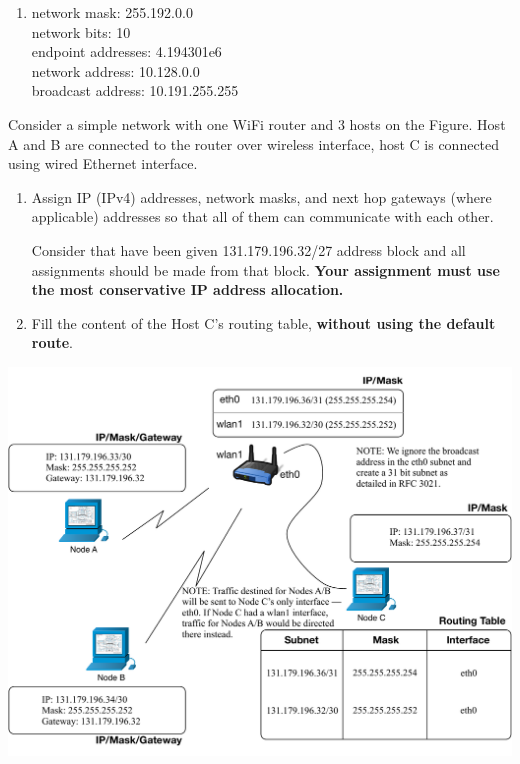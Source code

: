 \documentclass{report}
\begin{document}
\begin{problem}
\begin{answer}{30em}
\begin{multicols*}{2}
\begin{enumerate}
    \columnbreak

    \item network mask: 255.192.0.0\\
          network bits: 10\\
          endpoint addresses: 4.194301e6\\
          network address: 10.128.0.0\\
          broadcast address: 10.191.255.255
  \end{enumerate}
  \end{multicols*}
\end{answer}

\end{problem}


\clearpage
\begin{problem}

Consider a simple network with one WiFi router and 3 hosts on the Figure.  Host A and B are connected to the router over wireless interface, host C is connected using wired Ethernet interface.


\begin{enumerate}
\item Assign IP (IPv4) addresses, network masks, and next hop gateways (where applicable) addresses so that all of them can communicate with each other.

Consider that have been given 131.179.196.32/27 address block and all assignments should be made from that block.   \textbf{Your assignment must use the most conservative IP address allocation.}

\item Fill the content of the Host C's routing table, \textbf{without using the default route}.
\end{enumerate}

\vspace{1cm}

\includegraphics[scale=0.6]{hw6-topo}

\end{problem}
\end{document}
